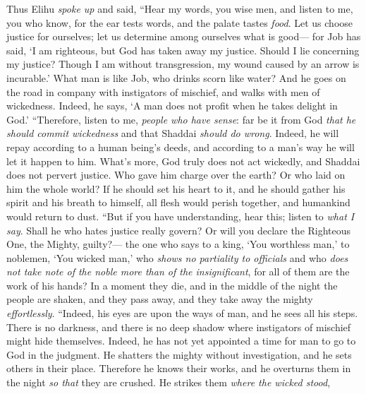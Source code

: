 \begin{biblechapter} %
 Thus Elihu \textit{spoke up} and said,
\verse “Hear my words, you wise men, 
and listen to me, you who know,
\verse for the ear tests words, 
and the palate tastes \textit{food}.
\verse Let us choose justice for ourselves; 
let us determine among ourselves what is good—
\verse for Job has said, ‘I am righteous, 
but God has taken away my justice.
\verse Should I lie concerning my justice? 
Though I am without transgression, my wound caused by an arrow is incurable.’
\verse What man is like Job, 
who drinks scorn like water?
\verse And he goes on the road in company with instigators of mischief, 
and walks with men of wickedness.
\verse Indeed, he says, ‘A man does not profit 
when he takes delight in God.’
\verse “Therefore, listen to me, \textit{people who have sense}: 
far be it from God \textit{that he should commit wickedness} 
and that Shaddai \textit{should do wrong}.
\verse Indeed, he will repay according to a human being’s deeds, 
and according to a man’s way he will let it happen to him.
\verse What’s more, God truly does not act wickedly, 
and Shaddai does not pervert justice.
\verse Who gave him charge over the earth? 
Or who laid on him the whole world?
\verse If he should set his heart to it, 
and he should gather his spirit and his breath to himself,
\verse all flesh would perish together, 
and humankind would return to dust.
\verse “But if you have understanding, hear this; 
listen to \textit{what I say}.
\verse Shall he who hates justice really govern? 
Or will you declare the Righteous One, the Mighty, guilty?—
\verse the one who says to a king, 
‘You worthless man,’ to noblemen, ‘You wicked man,’
\verse who \textit{shows no partiality to officials} 
and who \textit{does not take note of the noble more than of the insignificant}, 
for all of them are the work of his hands?
\verse In a moment they die, 
and in the middle of the night the people are shaken, and they pass away, 
and they take away the mighty \textit{effortlessly}.
\verse “Indeed, his eyes are upon the ways of man, 
and he sees all his steps.
\verse There is no darkness, and there is no deep shadow 
where instigators of mischief might hide themselves.
\verse Indeed, he has not yet appointed a time for man 
to go to God in the judgment.
\verse He shatters the mighty without investigation, 
and he sets others in their place.
\verse Therefore he knows their works, 
and he overturns them in the night 
\textit{so that} they are crushed.
\verse He strikes them \textit{where the wicked stood}, 

\end{biblechapter}
